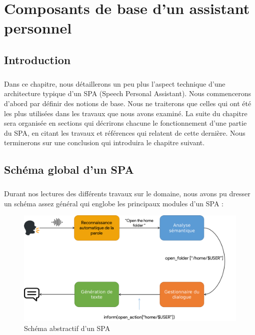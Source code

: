 \chapter{Composants de base d'un assistant personnel}

\section{Introduction}
\paragraph{}
Dans ce chapitre, nous détaillerons un peu plus l'aspect technique d'une architecture typique d'un SPA (Speech Personal Assistant). Nous commencerons d'abord par définir des notions de base. Nous ne  traiterons que celles qui ont été les plus utilisées dans les travaux que nous avons examiné. La suite du chapitre sera organisée en sections qui décrirons chacune le fonctionnement d'une partie du SPA, en citant les travaux et références qui relatent de cette dernière. Nous terminerons sur une conclusion qui introduira le chapitre suivant.

\section{Schéma global d'un SPA}
\label{spaSchemSection}
\paragraph{}
Durant nos lectures des différents travaux sur le domaine, nous avons pu dresser un schéma assez général qui englobe les principaux modules d'un SPA : 
\begin{figure}[H]
	\centering
	\includegraphics[width=0.8\linewidth]{images/SPA_diagram_2.png}
	\caption{Schéma abstractif d'un SPA \citep{spa_arch}}
	\label{fig:spaDiagram}
\end{figure}
